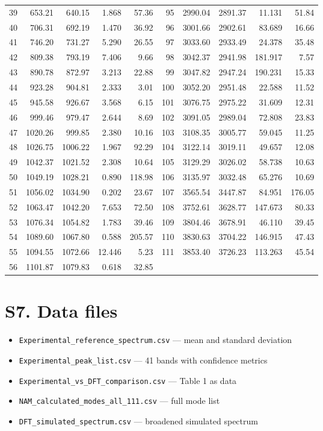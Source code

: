 \documentclass[11pt,a4paper]{article}
\begin{document}
\begin{longtable}{rrrrr@{\hskip 1.6em}rrrrr}
39 & 653.21 & 640.15 & 1.868 & 57.36 & 95 & 2990.04 & 2891.37 & 11.131 & 51.84 \\
40 & 706.31 & 692.19 & 1.470 & 36.92 & 96 & 3001.66 & 2902.61 & 83.689 & 16.66 \\
41 & 746.20 & 731.27 & 5.290 & 26.55 & 97 & 3033.60 & 2933.49 & 24.378 & 35.48 \\
42 & 809.38 & 793.19 & 7.406 & 9.66 & 98 & 3042.37 & 2941.98 & 181.917 & 7.57 \\
43 & 890.78 & 872.97 & 3.213 & 22.88 & 99 & 3047.82 & 2947.24 & 190.231 & 15.33 \\
44 & 923.28 & 904.81 & 2.333 & 3.01 & 100 & 3052.20 & 2951.48 & 22.588 & 11.52 \\
45 & 945.58 & 926.67 & 3.568 & 6.15 & 101 & 3076.75 & 2975.22 & 31.609 & 12.31 \\
46 & 999.46 & 979.47 & 2.644 & 8.69 & 102 & 3091.05 & 2989.04 & 72.808 & 23.83 \\
47 & 1020.26 & 999.85 & 2.380 & 10.16 & 103 & 3108.35 & 3005.77 & 59.045 & 11.25 \\
48 & 1026.75 & 1006.22 & 1.967 & 92.29 & 104 & 3122.14 & 3019.11 & 49.657 & 12.08 \\
49 & 1042.37 & 1021.52 & 2.308 & 10.64 & 105 & 3129.29 & 3026.02 & 58.738 & 10.63 \\
50 & 1049.19 & 1028.21 & 0.890 & 118.98 & 106 & 3135.97 & 3032.48 & 65.276 & 10.69 \\
51 & 1056.02 & 1034.90 & 0.202 & 23.67 & 107 & 3565.54 & 3447.87 & 84.951 & 176.05 \\
52 & 1063.47 & 1042.20 & 7.653 & 72.50 & 108 & 3752.61 & 3628.77 & 147.673 & 80.33 \\
53 & 1076.34 & 1054.82 & 1.783 & 39.46 & 109 & 3804.46 & 3678.91 & 46.110 & 39.45 \\
54 & 1089.60 & 1067.80 & 0.588 & 205.57 & 110 & 3830.63 & 3704.22 & 146.915 & 47.43 \\
55 & 1094.55 & 1072.66 & 12.446 & 5.23 & 111 & 3853.40 & 3726.23 & 113.263 & 45.54 \\
56 & 1101.87 & 1079.83 & 0.618 & 32.85 &  & & & &  \\
\end{longtable}

\section*{S7. Data files}
\begin{itemize}
\item \texttt{Experimental\_reference\_spectrum.csv} --- mean and standard deviation
\item \texttt{Experimental\_peak\_list.csv} --- 41 bands with confidence metrics
\item \texttt{Experimental\_vs\_DFT\_comparison.csv} --- Table 1 as data
\item \texttt{NAM\_calculated\_modes\_all\_111.csv} --- full mode list
\item \texttt{DFT\_simulated\_spectrum.csv} --- broadened simulated spectrum
\end{itemize}
\end{document}
